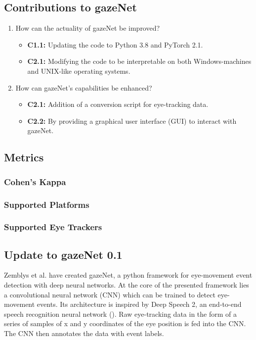 \documentclass[acmlarge]{acmart}
\begin{document}
\subsection{Contributions to gazeNet}
\begin{enumerate}
    \item How can the actuality of gazeNet be improved?
    \label{actuality}
          \begin{itemize}
              \item \textbf{C1.1:} Updating the code to Python 3.8 and PyTorch 2.1.
              \item \textbf{C2.1:} Modifying the code to be interpretable on both Windows-machines and UNIX-like operating systems.
          \end{itemize}
    \item How can gazeNet's capabilities be enhanced?
    \label{capabilities}
              \begin{itemize}
              \item \textbf{C2.1:} Addition of a conversion script for eye-tracking data.
              \item \textbf{C2.2:} By providing a graphical user interface (GUI) to interact with gazeNet.
          \end{itemize}
\end{enumerate}

\subsection{Metrics}
\subsubsection{Cohen's Kappa}

\subsubsection{Supported Platforms}

\subsubsection{Supported Eye Trackers}



\subsection{Update to gazeNet 0.1}
Zemblys et al. \cite{zemblys2018gazeNet} have created gazeNet, a python framework for eye-movement event detection with deep neural networks. At the core of the presented framework lies a convolutional neural network (CNN) which can be trained to detect eye-movement events. Its architecture is inspired by Deep Speech 2, an end-to-end speech recognition neural network (\cite{deep_speech_2,zemblys2018gazeNet}). Raw eye-tracking data in the form of a series of samples of x and y coordinates of the eye position is fed into the CNN. The CNN then annotates the data with event labels.
\end{document}
